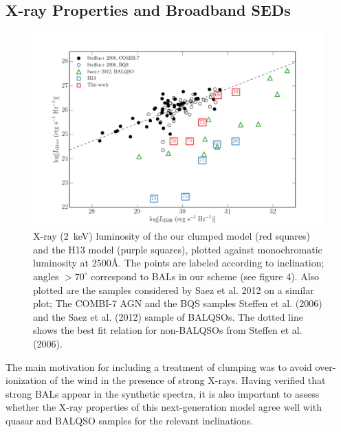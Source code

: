 \documentclass[useAMS,usenatbib]{mn2e_x}
\begin{document}


\subsection{X-ray Properties and Broadband SEDs}
\label{sec:xray}


\begin{figure} %
\centering
\includegraphics[width=1.0\textwidth]{figures/lx_a05_pre.png}
\caption
{
X-ray ($2$~keV) luminosity of the our clumped model (red squares) 
and the H13 model (purple squares), plotted against monochromatic luminosity 
at 2500\AA. The points are labeled according to inclination; angles
$>70^\circ$ correspond to BALs in our scheme (see figure 4).
Also plotted are the samples considered by Saez et al. 2012 on a similar plot; 
The COMBI-7 AGN and the BQS samples Steffen et al. (2006) and the Saez et al. (2012) 
sample of BALQSOs. The dotted line shows the best fit relation for non-BALQSOs 
from Steffen et al. (2006).
}
\label{fig:xray}
\end{figure} %

The main motivation for including a treatment of clumping was
to avoid over-ionization of the wind in the presence of strong X-rays. 
Having verified that strong BALs appear in the synthetic spectra,
it is also important to assess whether the X-ray properties of this
next-generation model agree well with quasar and BALQSO samples for the relevant
inclinations.
\end{document}
